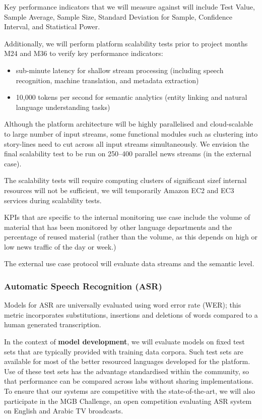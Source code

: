 Key performance indicators that we will measure against will include Test Value, Sample Average, Sample Size, Standard Deviation for Sample, Confidence Interval, and Statistical Power.

Additionally, we will perform \SUMMA platform scalability tests prior to project months M24 and M36 to verify key performance indicators:
\begin{itemize}
\item sub-minute latency for shallow stream processing (including speech recognition, machine translation, and metadata extraction)
\item 10,000 tokens per second for semantic analytics (entity linking and natural language understanding tasks)
\end{itemize}

Although the platform architecture will be highly parallelised and cloud-scalable to large number of input streams, some functional modules such as clustering into story-lines need to cut across all input streams simultaneously. We envision the final scalability test to be run on 250–400 parallel news streams (in the external  case).

The scalability tests will require computing clusters of significant sizef internal resources will not be sufficient, we will
temporarily  Amazon EC2 and EC3  services during scalability tests.

KPIs that are specific to the internal monitoring use case include the volume of material that has been monitored by other language departments and the percentage of reused material (rather than the volume, as this depends on high or low news traffic of the day or week.) 

The external use case protocol will evaluate data streams and the semantic level.


\subsubsection{Automatic Speech Recognition (ASR)}

Models for ASR are universally evaluated using word error rate (WER); this metric incorporates substitutions, insertions and deletions of words compared to a human generated transcription.

In the context of \textbf{model development}, we will evaluate models on fixed test sets that are typically provided with training data corpora. Such test sets are available for most of the better resourced languages developed for the \SUMMA platform.  Use of these test sets has the advantage  standardised within the community, so that performance can be compared across labs without sharing implementations.  To ensure that our systems are competitive with the state-of-the-art, we will also participate in the MGB Challenge, an open competition evaluating ASR system on English and Arabic TV broadcasts. 

